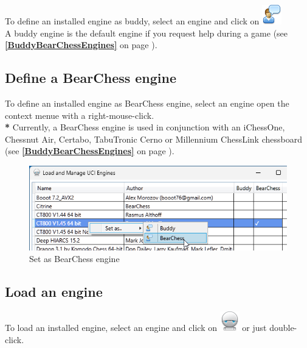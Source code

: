\documentclass[11pt,a4paper]{article}
\begin{document}
To define an installed engine as buddy, select an engine and click on \includegraphics[scale=0.5]{user_comment.png}\\
A buddy engine is the default engine if you request help during a game (see \textbf{\ref{BuddyBearChessEngines}  } on page \pageref{BuddyBearChessEngines}).


\subsection{Define a BearChess engine} \label{BearChessEngine}

To define an installed engine as BearChess engine, select an engine open the context menue with a right-mouse-click.\\
{\color{red}\textbf{*}} Currently, a BearChess engine is used in conjunction with an iChessOne, Chessnut Air, Certabo, TabuTronic Cerno or Millennium ChessLink chessboard (see  \textbf{\ref{BuddyBearChessEngines}  } on page \pageref{BuddyBearChessEngines}).

\begin{figure}[H]
	\centering
	\includegraphics[scale=0.8]{BearChessEngine1.png}
	\caption{Set as BearChess engine}
	\label{fig:BearChessEngine1}
\end{figure}


\subsection{Load an engine}

To load an installed engine, select an engine and click on \includegraphics[scale=0.5]{robot.png} or just double-click.
\end{document}
